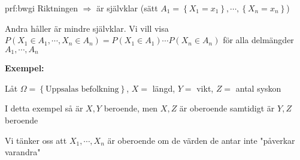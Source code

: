 \par\bigskip
\begin{prf}{prf:bwgi}
  Riktningen $\Rightarrow$ är självklar (sätt $A_1 = \left\{X_1=x_1\right\},\cdots,\left\{X_n=x_n\right\}$)
  \par\bigskip
  \noindent Andra håller är mindre självklar. Vi vill visa $P(X_1\in A_1,\cdots, X_n\in A_n) = P(X_1\in A_1)\cdots P(X_n\in A_n)$ för alla delmängder $A_1,\cdots, A_n$
\end{prf}
\par\bigskip
\noindent\textbf{Exempel:}\par
\noindent Låt $\Omega = \left\{\text{Uppsalas befolkning}\right\}$, $X= $ längd, $Y=$ vikt, $Z=$ antal syskon\par
\noindent I detta exempel så är $X,Y$ beroende, men $X,Z$ är oberoende samtidigt är $Y,Z$ beroende
\par\bigskip
\noindent Vi tänker oss att $X_1,\cdots,X_n$ är oberoende om de värden de antar inte "påverkar varandra"
\par\bigskip
